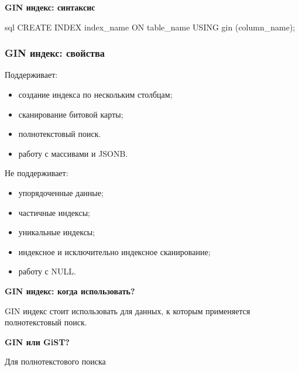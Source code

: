 \documentclass[aspectratio=169]{beamer}
\begin{document}
\begin{frame}[fragile]
  \begin{center}
    {\Large \textbf{GIN индекс: синтаксис}}

    \vspace*{1em}

    \begin{cminted}{sql}
      CREATE INDEX index_name ON table_name USING gin (column_name);
    \end{cminted}
  \end{center}
\end{frame}

\begin{frame}
  \frametitle{GIN индекс: свойства}

  Поддерживает:
  \begin{itemize}
    \item создание индекса по нескольким столбцам;
    \item сканирование битовой карты;
    \item полнотекстовый поиск.
    \item работу с массивами и JSONB.
  \end{itemize}

  Не поддерживает:
  \begin{itemize}
    \item упорядоченные данные;
    \item частичные индексы;
    \item уникальные индексы;
    \item индексное и исключительно индексное сканирование;
    \item работу с NULL.
  \end{itemize}
\end{frame}

\begin{frame}
  \vspace*{1em}
  \begin{center}
    {\LARGE \textbf{GIN индекс: когда использовать?}}

    \vspace*{1em}

    GIN индекс стоит использовать для данных, к которым применяется
    полнотекстовый поиск.
  \end{center}
\end{frame}

\begin{frame}
  \vspace*{1em}
  \begin{center}
    {\huge \textbf{GIN или GiST?}}

    \vspace*{1em}

    Для полнотекстового поиска
  \end{center}
\end{frame}
\end{document}
